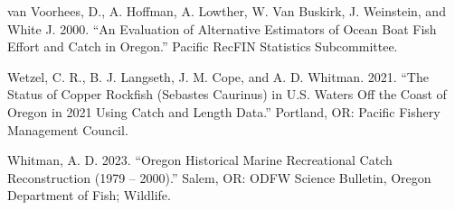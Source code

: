 \documentclass[11pt,
  english,
  letterpaper,
]{article}
\newlength{\cslhangindent}
\newenvironment{CSLReferences}[2] %
 {%
  \setlength{\parindent}{0pt}
  \ifodd #1 \everypar{\setlength{\hangindent}{\cslhangindent}}\ignorespaces\fi
  \ifnum #2 > 0
  \setlength{\parskip}{#2\baselineskip}
  \fi
 }%
 {}
\begin{document}
\begin{CSLReferences}{1}{0}
\leavevmode{}%
van Voorhees, D., A. Hoffman, A. Lowther, W. Van Buskirk, J. Weinstein, and White J. 2000. {``An Evaluation of Alternative Estimators of Ocean Boat Fish Effort and Catch in Oregon.''} Pacific RecFIN Statistics Subcommittee.

\leavevmode{}%
Wetzel, C. R., B. J. Langseth, J. M. Cope, and A. D. Whitman. 2021. {``The Status of Copper Rockfish ({S}ebastes Caurinus) in {U}.{S}. Waters Off the Coast of {O}regon in 2021 Using Catch and Length Data.''} Portland, OR: Pacific Fishery Management Council.

\leavevmode{}%
Whitman, A. D. 2023. {``Oregon Historical Marine Recreational Catch Reconstruction (1979 -- 2000).''} Salem, OR: {ODFW} Science Bulletin, Oregon Department of Fish; Wildlife.

\end{CSLReferences}
\end{document}
